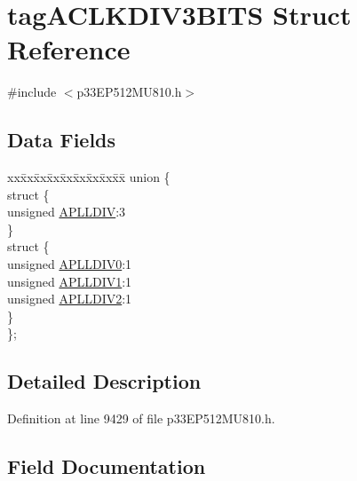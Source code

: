 \hypertarget{structtag_a_c_l_k_d_i_v3_b_i_t_s}{}\section{tag\+A\+C\+L\+K\+D\+I\+V3\+B\+I\+TS Struct Reference}
\label{structtag_a_c_l_k_d_i_v3_b_i_t_s}


{\ttfamily \#include $<$p33\+E\+P512\+M\+U810.\+h$>$}

\subsection*{Data Fields}
\begin{DoxyCompactItemize}
\item 
\begin{tabbing}
xx\=xx\=xx\=xx\=xx\=xx\=xx\=xx\=xx\=\kill
union \{\\
\>struct \{\\
\>\>unsigned \hyperlink{structtag_a_c_l_k_d_i_v3_b_i_t_s_a7bcc2b2edc4ab50a46eb1779b5a422b8}{APLLDIV}:3\\
\>\} \\
\>struct \{\\
\>\>unsigned \hyperlink{structtag_a_c_l_k_d_i_v3_b_i_t_s_a050effd4de6b420f5b7f4229cad13460}{APLLDIV0}:1\\
\>\>unsigned \hyperlink{structtag_a_c_l_k_d_i_v3_b_i_t_s_ab95896dcf911750f3f70114505af202a}{APLLDIV1}:1\\
\>\>unsigned \hyperlink{structtag_a_c_l_k_d_i_v3_b_i_t_s_a3b3d1c8b8c309e956554f34a1b46e059}{APLLDIV2}:1\\
\>\} \\
\}; \\

\end{tabbing}\end{DoxyCompactItemize}


\subsection{Detailed Description}


Definition at line 9429 of file p33\+E\+P512\+M\+U810.\+h.



\subsection{Field Documentation}
\mbox{\label{structtag_a_c_l_k_d_i_v3_b_i_t_s_a450f30bc62740dc31a9357d09f98d653}} 
